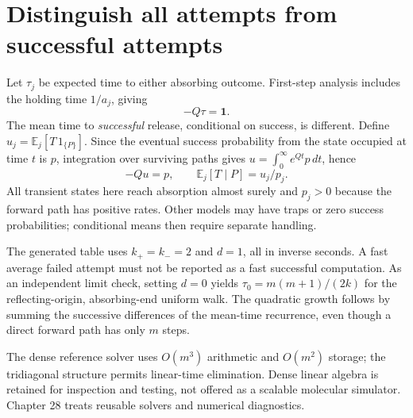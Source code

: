 
\section{Distinguish all attempts from successful attempts}
Let $\tau_j$ be expected time to either absorbing outcome. First-step analysis
includes the holding time $1/a_j$, giving
\begin{equation}
 -Q\tau=\boldsymbol 1.
\end{equation}
The mean time to \emph{successful} release, conditional on success, is different.
Define $u_j=\mathbb E_j[T\,1_{\{P\}}]$. Since the eventual success probability
from the state occupied at time $t$ is $p$, integration over surviving paths
gives $u=\int_0^\infty e^{Qt}p\,dt$, hence
\begin{equation}
 -Qu=p,\qquad \mathbb E_j[T\mid P]=u_j/p_j.
\end{equation}
All transient states here reach absorption almost surely and $p_j>0$ because
the forward path has positive rates. Other models may have traps or zero
success probabilities; conditional means then require separate handling.
\begin{center}\end{center}
The generated table uses $k_+=k_-=2$ and $d=1$, all in inverse seconds.
A fast average failed attempt must not be reported as a fast successful
computation. As an independent limit check, setting $d=0$ yields
$\tau_0=m(m+1)/(2k)$ for the reflecting-origin, absorbing-end uniform walk.
The quadratic growth follows by summing the successive differences of the
mean-time recurrence, even though a direct forward path has only $m$ steps.

The dense reference solver uses $O(m^3)$ arithmetic and $O(m^2)$ storage;
the tridiagonal structure permits linear-time elimination. Dense linear algebra
is retained for inspection and testing, not offered as a scalable molecular
simulator. Chapter 28 treats reusable solvers and numerical diagnostics.

